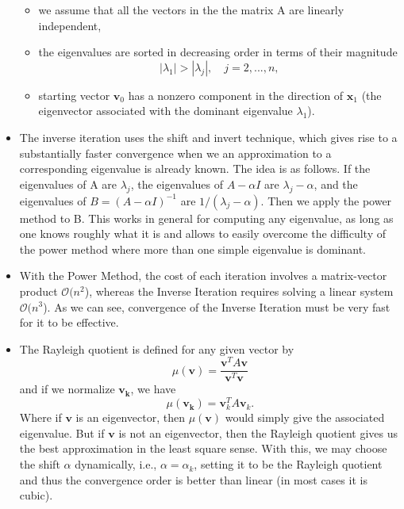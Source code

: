 \documentclass[unicode,11pt,a4paper,oneside,numbers=endperiod,openany]{scrartcl}
\begin{document}
\begin{itemize}
\begin{itemize}
  \item we assume that all the vectors in the the matrix A are linearly independent, 
  \item the eigenvalues are sorted in decreasing order in terms of their magnitude
        \[ |\lambda_1| > |\lambda_j|, \quad   j = 2,...,n,\]
  \item starting vector $\mathbf{v}_0$ has a nonzero component in the direction of $\mathbf{x}_1$ (the eigenvector associated with the dominant eigenvalue \( \lambda_1\)).
\end{itemize}
  \item The inverse iteration uses the shift and invert technique, which gives rise to a substantially faster convergence when we an approximation to a corresponding eigenvalue is already known.
  The idea is as follows. If the eigenvalues of A are $\lambda_j$, the eigenvalues of $A - \alpha I$ are $\lambda_j - \alpha$, and the eigenvalues of $B = (A - \alpha I)^{-1}$ are $1 / (\lambda_j - \alpha)$. Then we apply the power method to B. This works in general for computing any eigenvalue, as long as one knows roughly what it is and allows to easily overcome the difficulty of the power method where more than one simple eigenvalue is dominant. 
  \item With the Power Method, the cost of each iteration involves a matrix-vector product $\mathcal{O}(n^2$), whereas the Inverse
  Iteration requires solving a linear system $\mathcal{O}(n^3$). As we can see, convergence of the Inverse Iteration must be very fast for it to be effective.
  \item The Rayleigh quotient is defined for any given vector by \[ \mu (\mathbf{v}) = \frac{\mathbf{v}^TA\mathbf{v}}{\mathbf{v}^T \mathbf{v}} \] and if we normalize $\mathbf{v_k}$, we have \[ \mu (\mathbf{v_k}) = \mathbf{v}_k^TA\mathbf{v}_k.\] Where if $\mathbf{v}$ is an eigenvector, then $\mu (\mathbf{v})$ would simply give the associated eigenvalue. But if $\mathbf{v}$ is not an eigenvector,
  then the Rayleigh quotient gives us the best approximation in the least square sense. With this, we may choose the shift $\alpha$ dynamically, i.e., $\alpha = \alpha_k$, setting it to be the Rayleigh quotient and thus the convergence order is better than linear (in most cases it is cubic).
\end{itemize}

\newpage
\end{document}
